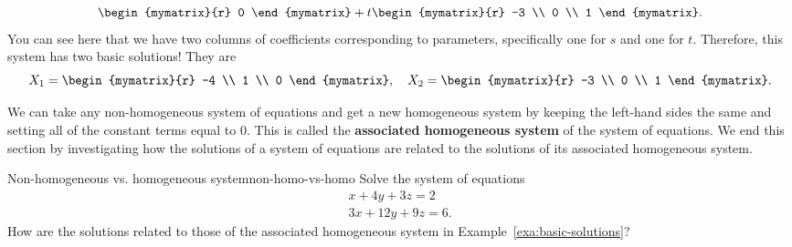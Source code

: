 \begin{solution}
\begin{equation*}
\begin{mymatrix}{r}
      0
    \end{mymatrix}
    + 
    t
    \begin{mymatrix}{r}
      -3 \\
      0 \\
      1
    \end{mymatrix}.
  \end{equation*}
  You can see here that we have two columns of coefficients
  corresponding to parameters, specifically one for $s$ and one for $t$.
  Therefore, this system has two basic solutions! They are
  \begin{equation*}
    X_1=
    \begin{mymatrix}{r}
      -4 \\
      1 \\
      0
    \end{mymatrix},\quad X_2 = \begin{mymatrix}{r}
      -3 \\
      0 \\
      1
    \end{mymatrix}.
  \end{equation*} 
\end{solution}

We can take any non-homogeneous system of equations and get a new
homogeneous system by keeping the left-hand sides the same and setting
all of the constant terms equal to $0$. This is called the
\textbf{associated homogeneous system}%
%
of the system of equations. We end this section by investigating how
the solutions of a system of equations are related to the solutions of
its associated homogeneous system.

\begin{example}{Non-homogeneous vs. homogeneous system}{non-homo-vs-homo}
  Solve the system of equations
  \begin{equation}\label{eqn:non-homo-vs-homo-1}
    \begin{array}{c}
      x + 4y + 3z = 2 \\
      3x + 12y + 9z = 6.
    \end{array}
  \end{equation}
  How are the solutions related to those of the associated homogeneous
  system in Example~\ref{exa:basic-solutions}?
\end{example}

